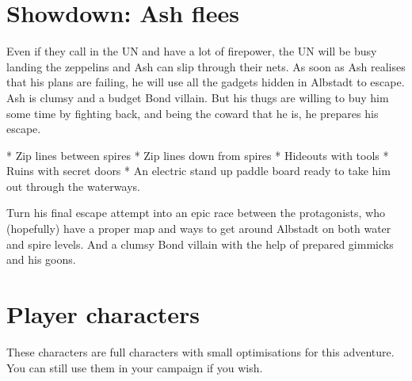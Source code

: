 \section{Showdown: Ash flees}
Even if they call in the UN and have a lot of firepower, the UN will be busy landing the zeppelins and Ash can slip through their nets. As soon as Ash realises that his plans are failing, he will use all the gadgets hidden in Albstadt to escape. Ash is clumsy and a budget Bond villain. But his thugs are willing to buy him some time by fighting back, and being the coward that he is, he prepares his escape.

* Zip lines between spires
* Zip lines down from spires
* Hideouts with tools
* Ruins with secret doors
* An electric stand up paddle board ready to take him out through the waterways.

Turn his final escape attempt into an epic race between the protagonists, who (hopefully) have a proper map and ways to get around Albstadt on both water and spire levels. And a clumsy Bond villain with the help of prepared gimmicks and his goons.

\section{Player characters}

These characters are full characters with small optimisations for this adventure. You can still use them in your campaign if you wish.

\newpage


